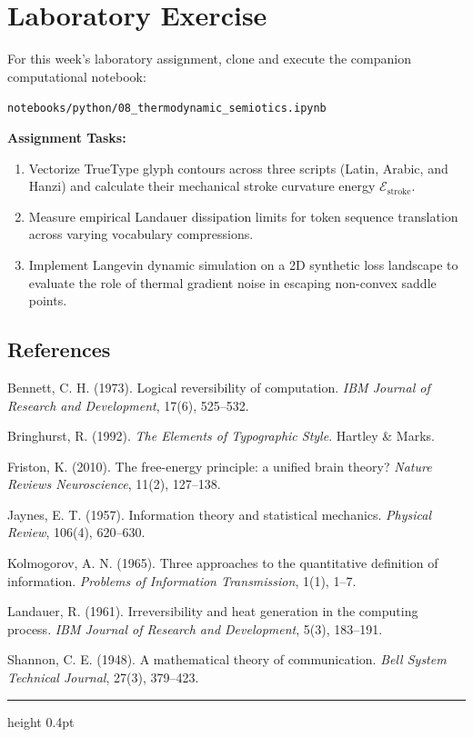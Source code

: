 \documentclass[11pt,letterpaper]{article}
\begin{document}
\section{Laboratory Exercise}
For this week's laboratory assignment, clone and execute the companion computational notebook:
\begin{center}
    \texttt{notebooks/python/08\_thermodynamic\_semiotics.ipynb}
\end{center}

\textbf{Assignment Tasks:}
\begin{enumerate}[noitemsep,topsep=1.5pt]
    \item Vectorize TrueType glyph contours across three scripts (Latin, Arabic, and Hanzi) and calculate their mechanical stroke curvature energy $\mathcal{E}_{\text{stroke}}$.
    \item Measure empirical Landauer dissipation limits for token sequence translation across varying vocabulary compressions.
    \item Implement Langevin dynamic simulation on a 2D synthetic loss landscape to evaluate the role of thermal gradient noise in escaping non-convex saddle points.
\end{enumerate}

\subsection*{References}
{\footnotesize
\begin{enumerate}[label={[\arabic*]},noitemsep,topsep=1pt,itemsep=1pt]
    \item Bennett, C. H. (1973). Logical reversibility of computation. \textit{IBM Journal of Research and Development}, 17(6), 525--532.
    \item Bringhurst, R. (1992). \textit{The Elements of Typographic Style}. Hartley \& Marks.
    \item Friston, K. (2010). The free-energy principle: a unified brain theory? \textit{Nature Reviews Neuroscience}, 11(2), 127--138.
    \item Jaynes, E. T. (1957). Information theory and statistical mechanics. \textit{Physical Review}, 106(4), 620--630.
    \item Kolmogorov, A. N. (1965). Three approaches to the quantitative definition of information. \textit{Problems of Information Transmission}, 1(1), 1--7.
    \item Landauer, R. (1961). Irreversibility and heat generation in the computing process. \textit{IBM Journal of Research and Development}, 5(3), 183--191.
    \item Shannon, C. E. (1948). A mathematical theory of communication. \textit{Bell System Technical Journal}, 27(3), 379--423.
\end{enumerate}
}

\vspace{0.3em}
\hrule height 0.4pt \vspace{0.3em}
\end{document}
